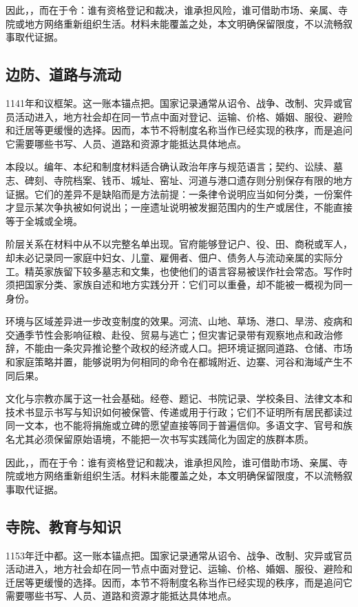 因此，，而在于令：谁有资格登记和裁决，谁承担风险，谁可借助市场、亲属、寺院或地方网络重新组织生活。材料未能覆盖之处，本文明确保留限度，不以流畅叙事取代证据。

\subsection{边防、道路与流动}

1141年和议框架。这一账本锚点把。国家记录通常从诏令、战争、改制、灾异或官员活动进入，地方社会却在同一节点中面对登记、运输、价格、婚姻、服役、避险和迁居等更缓慢的选择。因而，本节不将制度名称当作已经实现的秩序，而是追问它需要哪些书写、人员、道路和资源才能抵达具体地点。

本段以。编年、本纪和制度材料适合确认政治年序与规范语言；契约、讼牍、墓志、碑刻、寺院档案、钱币、城址、窑址、河道与港口遗存则分别保存有限的地方证据。它们的差异不是缺陷而是方法前提：一条律令说明应当如何分类，一份案件才显示某次争执被如何说出；一座遗址说明被发掘范围内的生产或居住，不能直接等于全城或全境。

阶层关系在材料中从不以完整名单出现。官府能够登记户、役、田、商税或军人，却未必记录同一家庭中妇女、儿童、雇佣者、佃户、债务人与流动亲属的实际分工。精英家族留下较多墓志和文集，也使他们的语言容易被误作社会常态。写作时须把国家分类、家族自述和地方实践分开：它们可以重叠，却不能被一概视为同一身份。

环境与区域差异进一步改变制度的效果。河流、山地、草场、港口、旱涝、疫病和交通季节性会影响征粮、赴役、贸易与逃亡；但灾害记录带有观察地点和政治修辞，不能由一条灾异推论整个政权的经济或人口。把环境证据同道路、仓储、市场和家庭策略并置，能够说明为何相同的命令在都城附近、边寨、河谷和海域产生不同后果。

文化与宗教亦属于这一社会基础。经卷、题记、书院记录、学校条目、法律文本和技术书显示书写与知识如何被保管、传递或用于行政；它们不证明所有居民都读过同一文本，也不能将捐施或立碑的愿望直接等同于普遍信仰。多语文字、官号和族名尤其必须保留原始语境，不能把一次书写实践简化为固定的族群本质。

因此，，而在于令：谁有资格登记和裁决，谁承担风险，谁可借助市场、亲属、寺院或地方网络重新组织生活。材料未能覆盖之处，本文明确保留限度，不以流畅叙事取代证据。

\subsection{寺院、教育与知识}

1153年迁中都。这一账本锚点把。国家记录通常从诏令、战争、改制、灾异或官员活动进入，地方社会却在同一节点中面对登记、运输、价格、婚姻、服役、避险和迁居等更缓慢的选择。因而，本节不将制度名称当作已经实现的秩序，而是追问它需要哪些书写、人员、道路和资源才能抵达具体地点。

